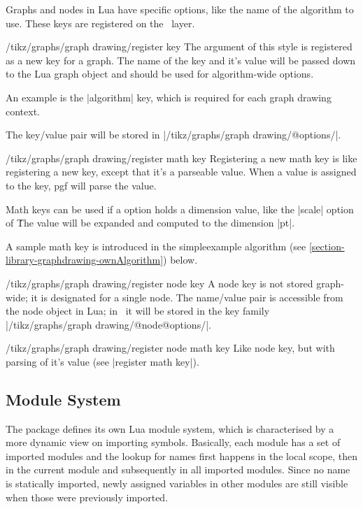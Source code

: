 Graphs and nodes in Lua have specific options, like the name of the
algorithm to use. These keys are registered on the \tikzname\ layer.


\begin{stylekey}{/tikz/graphs/graph drawing/register key}
  The argument of this style is registered as a new key for a
  graph. The name of the key and it's value will be passed down to the
  Lua graph object and should be used for algorithm-wide options. 

  An example is the |algorithm| key, which is required for each graph
  drawing context. 

  The key/value pair will be stored in |/tikz/graphs/graph drawing/@options/|.
\end{stylekey}

\begin{stylekey}{/tikz/graphs/graph drawing/register math key}
  Registering a new math key is like registering a new key, except
  that it's a parseable value. When a value is assigned to the key,
  pgf will parse the value. 

  Math keys can be used if a option holds a dimension value, like the
  |scale| option of \tikzname\. The value will be expanded and
  computed to the dimension |pt|. 

  A sample math key is introduced in the simpleexample algorithm
  (see \ref{section-library-graphdrawing-ownAlgorithm}) below.
\end{stylekey}

\begin{stylekey}{/tikz/graphs/graph drawing/register node key}
  A node key is not stored graph-wide; it is designated for a single
  node. The name/value pair is accessible from the node object in Lua;
  in \tikzname\ it will be stored in the key family |/tikz/graphs/graph drawing/@node@options/|.
\end{stylekey}

\begin{stylekey}{/tikz/graphs/graph drawing/register node math key}
  Like node key, but with parsing of it's value (see |register math key|).
\end{stylekey}


\subsection{Module System}
The package defines its own Lua module system, which is characterised by a
more dynamic view on importing symbols.  Basically, each module has a
set of imported modules and the lookup for names first happens in the local
scope, then in the current module and subsequently in all imported
modules.  Since no name is statically imported, newly assigned
variables in other modules are still visible when those were
previously imported.

